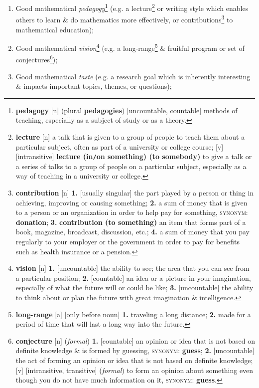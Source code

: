 \documentclass[oneside]{book}
\numberwithin{equation}{section}
\begin{document}
\begin{enumerate}
	\item Good mathematical \textit{pedagogy}\footnote{\textbf{pedagogy} [n] (plural \textbf{pedagogies}) [uncountable, countable] methods of teaching, especially as a subject of study or as a theory.} (e.g. a lecture\footnote{\textbf{lecture} [n] a talk that is given to a group of people to teach them about a particular subject, often as part of a university or college course; [v] [intransitive] \textbf{lecture (in\texttt{/}on something) (to somebody)} to give a talk or a series of talks to a group of people on a particular subject, especially as a way of teaching in a university or college.} or writing style which enables others to learn \& do mathematics more effectively, or contributions\footnote{\textbf{contribution} [n] \textbf{1.} [usually singular] the part played by a person or thing in achieving, improving or causing something; \textbf{2.} a sum of money that is given to a person or an organization in order to help pay for something, \textsc{synonym}: \textbf{donation}; \textbf{3.} \textbf{contribution (to something)} an item that forms part of a book, magazine, broadcast, discussion, etc.; \textbf{4.} a sum of money that you pay regularly to your employer or the government in order to pay for benefits such as health insurance or a pension.} to mathematical education);
	\item Good mathematical \textit{vision}\footnote{\textbf{vision} [n] \textbf{1.} [uncountable] the ability to see; the area that you can see from a particular position; \textbf{2.} [countable] an idea or a picture in your imagination, especially of what the future will or could be like; \textbf{3.} [uncountable] the ability to think about or plan the future with great imagination \& intelligence.} (e.g. a long-range\footnote{\textbf{long-range} [a] [only before noun] \textbf{1.} traveling a long distance; \textbf{2.} made for a period of time that will last a long way into the future.} \& fruitful program or set of conjectures\footnote{\textbf{conjecture} [n] (\textit{formal}) \textbf{1.} [countable] an opinion or idea that is not based on definite knowledge \& is formed by guessing, \textsc{synonym}: \textbf{guess}; \textbf{2.} [uncountable] the act of forming an opinion or idea that is not based on definite knowledge; [v] [intransitive, transitive] (\textit{formal}) to form an opinion about something even though you do not have much information on it, \textsc{synonym}: \textbf{guess}.});
	\item Good mathematical \textit{taste} (e.g. a research goal which is inherently interesting \& impacts important topics, themes, or questions);

\end{enumerate}
\end{document}
